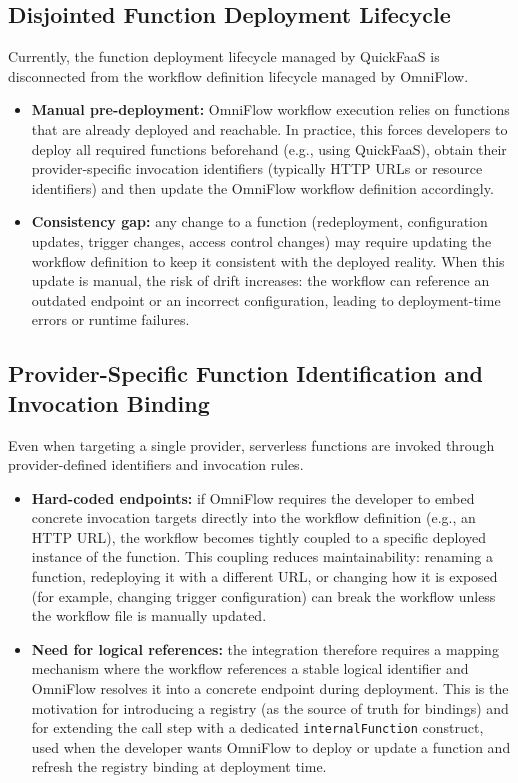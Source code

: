 \subsection{Disjointed Function Deployment Lifecycle}
Currently, the function deployment lifecycle managed by QuickFaaS is disconnected from the workflow definition lifecycle managed by OmniFlow.
\begin{itemize}
	\item \textbf{Manual pre-deployment:} OmniFlow workflow execution relies on functions that are already deployed and reachable. In practice, this forces developers to deploy all required functions beforehand (e.g., using QuickFaaS), obtain their provider-specific invocation identifiers (typically HTTP URLs or resource identifiers) and then update the OmniFlow workflow definition accordingly.

	\item \textbf{Consistency gap:} any change to a function (redeployment, configuration updates, trigger changes, access control changes) may require updating the workflow definition to keep it consistent with the deployed reality. When this update is manual, the risk of drift increases: the workflow can reference an outdated endpoint or an incorrect configuration, leading to deployment-time errors or runtime failures.
\end{itemize}

\subsection{Provider-Specific Function Identification and Invocation Binding}
Even when targeting a single provider, serverless functions are invoked through provider-defined identifiers and invocation rules.
\begin{itemize}
	\item \textbf{Hard-coded endpoints:} if OmniFlow requires the developer to embed concrete invocation targets directly into the workflow definition (e.g., an HTTP URL), the workflow becomes tightly coupled to a specific deployed instance of the function. This coupling reduces maintainability: renaming a function, redeploying it with a different URL, or changing how it is exposed (for example, changing trigger configuration) can break the workflow unless the workflow file is manually updated.

	\item \textbf{Need for logical references:} the integration therefore requires a mapping mechanism where the workflow references a stable logical identifier and OmniFlow resolves it into a concrete endpoint during deployment. This is the motivation for introducing a registry (as the source of truth for bindings) and for extending the call step with a dedicated \texttt{internalFunction} construct, used when the developer wants OmniFlow to deploy or update a function and refresh the registry binding at deployment time.
\end{itemize}

